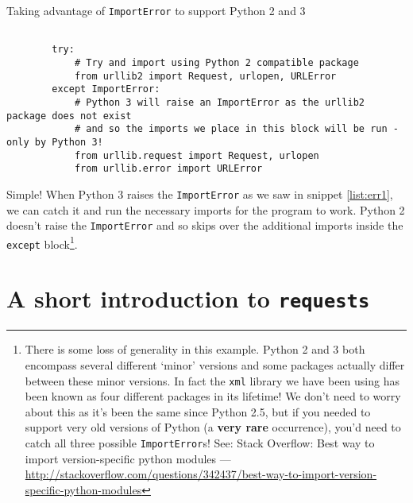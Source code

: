 \documentclass[a4paper]{article}
\begin{document}
\begin{listing}[H]
    \caption[]{Taking advantage of \texttt{ImportError} to support Python 2 and 3}
    \label{list:import_except}
    \begin{verbatim}

        try:
            # Try and import using Python 2 compatible package
            from urllib2 import Request, urlopen, URLError
        except ImportError:
            # Python 3 will raise an ImportError as the urllib2 package does not exist
            # and so the imports we place in this block will be run - only by Python 3!
            from urllib.request import Request, urlopen
            from urllib.error import URLError

    \end{verbatim}
\end{listing}

Simple! When Python 3 raises the \texttt{ImportError} as we saw in snippet \ref{list:err1},
we can catch it and run the necessary imports for the program to work. Python 2
doesn't raise the \texttt{ImportError} and so skips over the additional imports
inside the \texttt{except} block\footnote{There is some loss of generality in this example.
Python 2 and 3 both encompass several different `minor' versions and some packages
actually differ between these minor versions. In fact the \texttt{xml} library we
have been using has been known as four different packages in its lifetime! We don't
need to worry about this as it's been the same since Python 2.5, but if you needed
to support very old versions of Python (a \textbf{very rare} occurrence), you'd need to catch all three possible \texttt{ImportError}s! See: Stack Overflow: Best way to import version-specific python modules ---
{\href{http://stackoverflow.com/questions/342437/best-way-to-import-version-specific-python-modules}{http://stackoverflow.com/questions/342437/best-way-to-import-version-specific-python-modules}}}.

\pagebreak

\section*{A short introduction to \texttt{requests}}
\end{document}
